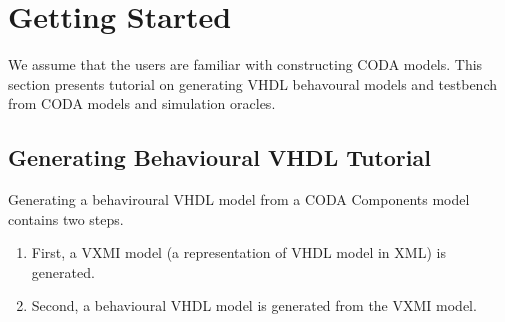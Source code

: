 \section{Getting Started}
\label{sec:vhdl-getting-started}

We assume that the users are familiar with constructing CODA models.  This section presents tutorial on generating VHDL behavoural models and testbench from CODA models and simulation oracles.

\subsection{Generating Behavioural VHDL Tutorial}
\label{sec:vhdl-generate-behavioural-model-tutorial}
Generating a behaviroural VHDL model from a CODA Components model contains two steps.
\begin{enumerate}
\item First, a VXMI model (a representation of VHDL model in XML) is generated.

\item Second, a behavioural VHDL model is generated from the VXMI model.
\end{enumerate}

